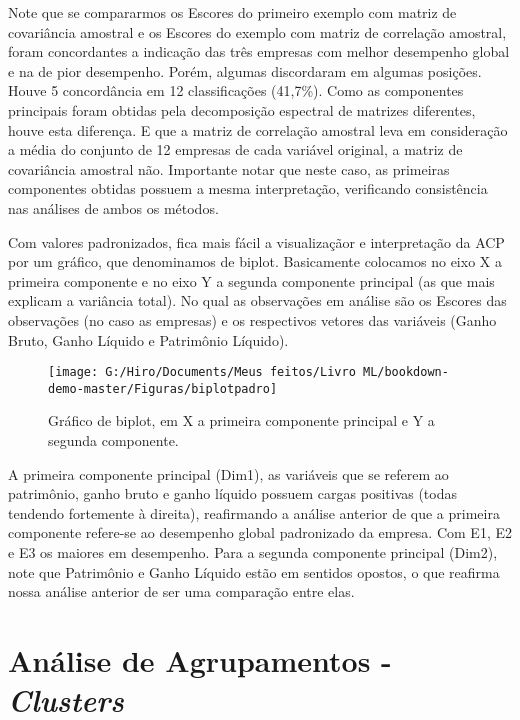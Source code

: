 \documentclass[
]{book}
\begin{document}
Note que se compararmos os Escores do primeiro exemplo com matriz de covariância amostral e os Escores do exemplo com matriz de correlação amostral, foram concordantes a indicação das três empresas com melhor desempenho global e na de pior desempenho. Porém, algumas discordaram em algumas posições. Houve 5 concordância em 12 classificações (41,7\%). Como as componentes principais foram obtidas pela decomposição espectral de matrizes diferentes, houve esta diferença. E que a matriz de correlação amostral leva em consideração a média do conjunto de 12 empresas de cada variável original, a matriz de covariância amostral não. Importante notar que neste caso, as primeiras componentes obtidas possuem a mesma interpretação, verificando consistência nas análises de ambos os métodos.

Com valores padronizados, fica mais fácil a visualizaçãor e interpretação da ACP por um gráfico, que denominamos de biplot. Basicamente colocamos no eixo X a primeira componente e no eixo Y a segunda componente principal (as que mais explicam a variância total). No qual as observações em análise são os Escores das observações (no caso as empresas) e os respectivos vetores das variáveis (Ganho Bruto, Ganho Líquido e Patrimônio Líquido).

\begin{figure}

{\centering \texttt{[image: G:/Hiro/Documents/Meus feitos/Livro ML/bookdown-demo-master/Figuras/biplotpadro]} 

}

\caption{Gráfico de biplot, em X a primeira componente principal e Y a segunda componente.}\label{fig:biplotpadro}
\end{figure}



A primeira componente principal (Dim1), as variáveis que se referem ao patrimônio, ganho bruto e ganho líquido possuem cargas positivas (todas tendendo fortemente à direita), reafirmando a análise anterior de que a primeira componente refere-se ao desempenho global padronizado da empresa. Com E1, E2 e E3 os maiores em desempenho.
Para a segunda componente principal (Dim2), note que Patrimônio e Ganho Líquido estão em sentidos opostos, o que reafirma nossa análise anterior de ser uma comparação entre elas.

\hypertarget{anuxe1lise-de-agrupamentos---clusters}{%
\section{\texorpdfstring{Análise de Agrupamentos - \emph{Clusters}}{Análise de Agrupamentos - Clusters}}\label{anuxe1lise-de-agrupamentos---clusters}}
\end{document}
